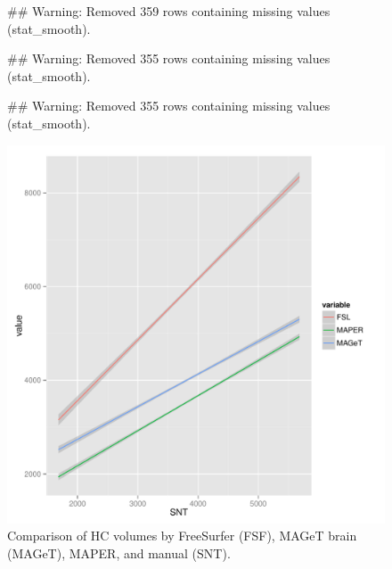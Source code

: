 \documentclass{article}\usepackage{graphicx, color}
\makeatletter
\def\maxwidth{ %
  \ifdim\Gin@nat@width>\linewidth
    \linewidth
  \else
    \Gin@nat@width
  \fi
}
\newenvironment{kframe}{%
 \def\at@end@of@kframe{}%
 \ifinner\ifhmode%
  \def\at@end@of@kframe{\end{minipage}}%
  \begin{minipage}{\columnwidth}%
 \fi\fi%
 \def\FrameCommand##1{\hskip\@totalleftmargin \hskip-\fboxsep
 \colorbox{shadecolor}{##1}\hskip-\fboxsep
     \hskip-\linewidth \hskip-\@totalleftmargin \hskip\columnwidth}%
 \MakeFramed {\advance\hsize-\width
   \@totalleftmargin\z@ \linewidth\hsize
   \@setminipage}}%
 {\par\unskip\endMakeFramed%
 \at@end@of@kframe}
\newenvironment{knitrout}{}{} %
\makeatother
\begin{document}
\begin{figure}[h]
\begin{knitrout}
\color{fgcolor}\begin{kframe}


{\ttfamily\noindent\textcolor{warningcolor}{\#\# Warning: Removed 359 rows containing missing values (stat\_smooth).}}

{\ttfamily\noindent\textcolor{warningcolor}{\#\# Warning: Removed 355 rows containing missing values (stat\_smooth).}}

{\ttfamily\noindent\textcolor{warningcolor}{\#\# Warning: Removed 355 rows containing missing values (stat\_smooth).}}\end{kframe}

{\centering \includegraphics[width=\maxwidth]{figure/ADNI-baseline-volumes-plot} 

}


\end{knitrout}

  \caption{Comparison of HC volumes by FreeSurfer (FSF), MAGeT brain (MAGeT), MAPER, and manual (SNT).}
  \label{ADNI-baseline-volumes-plot}
\end{figure}
\end{document}
